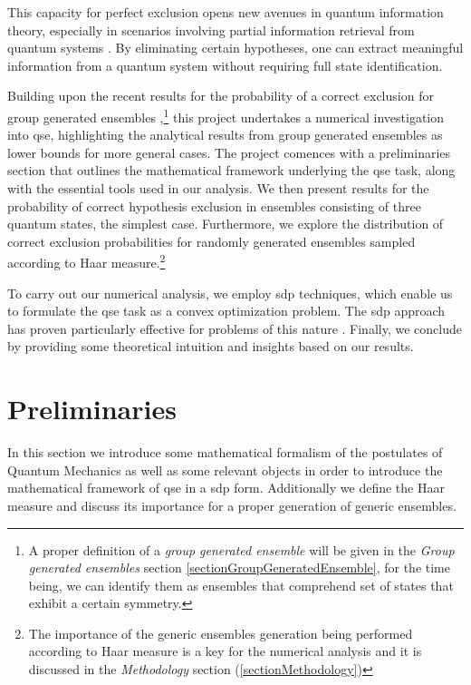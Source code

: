 \documentclass[12pt,letterpaper]{article}
\begin{document}
This capacity for perfect exclusion opens new avenues in quantum information theory, especially in scenarios involving partial information retrieval from quantum systems \cite{gour2020weight}. By eliminating certain hypotheses, one can extract meaningful information from a quantum system without requiring full state identification.

Building upon the recent results for the probability of a correct exclusion for group generated ensembles \cite{MainPaper},\footnote{A proper definition of a \emph{group generated ensemble} will be given in the \emph{Group generated ensembles} section \ref{sectionGroupGeneratedEnsemble}, for the time being, we can identify them as ensembles that comprehend set of states that exhibit a certain symmetry.} this project undertakes a numerical investigation into \gls{qse}, highlighting the analytical results from group generated ensembles as lower bounds for more general cases. The project comences with a preliminaries section that outlines the mathematical framework underlying the \gls{qse} task, along with the essential tools used in our analysis. We then present results for the probability of correct hypothesis exclusion in ensembles consisting of three quantum states, the simplest case. Furthermore, we explore the distribution of correct exclusion probabilities for randomly generated ensembles sampled according to Haar measure.\footnote{The importance of the generic ensembles generation being performed according to Haar measure is a key for the numerical analysis and it is discussed in the \emph{Methodology} section (\ref{sectionMethodology})}

To carry out our numerical analysis, we employ \gls{sdp} techniques,\cite{vandenberghe1996semidefinite} which enable us to formulate the \gls{qse} task as a convex optimization problem. The \gls{sdp} approach has proven particularly effective for problems of this nature \cite{bandyopadhyay2014conclusive}. Finally, we conclude by providing some theoretical intuition and insights based on our results.

\newpage
\section{Preliminaries}

\hspace{20pt}In this section we introduce some mathematical formalism of the postulates of Quantum Mechanics as well as some relevant objects in order to introduce the mathematical framework of \gls{qse} in a \gls{sdp} form. Additionally we define the Haar measure and discuss its importance for a proper generation of generic ensembles.
\end{document}

